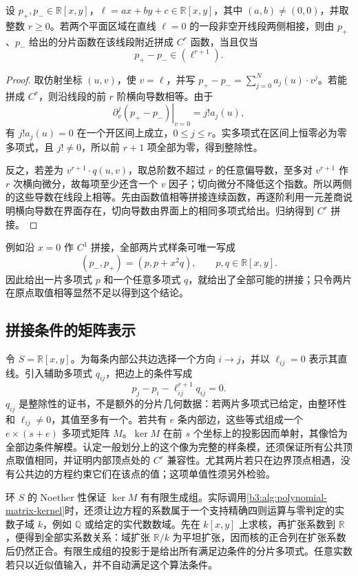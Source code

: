 \begin{proposition}\label{b3:prop:spline-divisibility}
	设 \(p_+,p_-\in\mathbb R[x,y]\)，\(\ell=ax+by+c\in\mathbb R[x,y]\)，其中 \((a,b)\ne(0,0)\)，并取整数 \(r\ge0\)。若两个平面区域在直线 \(\ell=0\) 的一段非空开线段两侧相接，则由 \(p_+\)、\(p_-\) 给出的分片函数在该线段附近拼成 \(C^r\) 函数，当且仅当
	\[
		p_+-p_-\in(\ell^{r+1}).
	\]
\end{proposition}
\begin{proof}
	取仿射坐标 \((u,v)\)，使 \(v=\ell\)，并写 \(p_+-p_-=\sum_{j=0}^N a_j(u)\cdot v^j\)。若能拼成 \(C^r\)，则沿线段的前 \(r\) 阶横向导数相等。由于
	\[
		\left.\partial_v^j(p_+-p_-)\right|_{v=0}=j!a_j(u),
	\]
	有 \(j!a_j(u)=0\) 在一个开区间上成立，\(0\le j\le r\)。实多项式在区间上恒零必为零多项式，且 \(j!\ne0\)，所以前 \(r+1\) 项全部为零，得到整除性。

	反之，若差为 \(v^{r+1}\cdot q(u,v)\)，取总阶数不超过 \(r\) 的任意偏导数，至多对 \(v^{r+1}\) 作 \(r\) 次横向微分，故每项至少还含一个 \(v\) 因子；切向微分不降低这个指数。所以两侧的这些导数在线段上相等。先由函数值相等拼接连续函数，再逐阶利用一元差商说明横向导数在界面存在，切向导数由界面上的相同多项式给出。归纳得到 \(C^r\) 拼接。
\end{proof}

例如沿 \(x=0\) 作 \(C^1\) 拼接，全部两片式样条可唯一写成
\[
	(p_-,p_+)=(p,p+x^2q),\qquad p,q\in\mathbb R[x,y].
\]
因此给出一片多项式 \(p\) 和一个任意多项式 \(q\)，就给出了全部可能的拼接；只令两片在原点取值相等显然不足以得到这个结论。

\subsection{拼接条件的矩阵表示}
\label{b3:subsec:2106:02}

令 \(S=\mathbb R[x,y]\)。为每条内部公共边选择一个方向 \(i\to j\)，并以 \(\ell_{ij}=0\) 表示其直线。引入辅助多项式 \(q_{ij}\)，把边上的条件写成
\[
	p_j-p_i-\ell_{ij}^{r+1}q_{ij}=0.
\]
\(q_{ij}\) 是整除性的证书，不是额外的分片几何数据：若两片多项式已给定，由整环性和 \(\ell_{ij}\ne0\)，其值至多有一个。若共有 \(e\) 条内部边，这些等式组成一个 \(e\times(s+e)\) 多项式矩阵 \(M\)。\(\ker M\) 在前 \(s\) 个坐标上的投影因而单射，其像恰为全部边条件解模。认定一般划分上的这个像为完整的样条模，还须保证所有公共顶点取值相同，并证明内部顶点处的 \(C^r\) 兼容性。尤其两片若只在边界顶点相遇，没有公共边的方程约束它们在该点的值；这项单值性须另外检验。

\ProseParagraphBreak
环 \(S\) 的 Noether 性保证 \(\ker M\) 有有限生成组。实际调用\cref{b3:alg:polynomial-matrix-kernel}时，还须让边方程的系数属于一个支持精确四则运算与零判定的实数子域 \(k\)，例如 \(\mathbb Q\) 或给定的实代数数域。先在 \(k[x,y]\) 上求核，再扩张系数到 \(\mathbb R\)，便得到全部实系数关系：域扩张 \(\mathbb R/k\) 为平坦扩张，因而核的正合列在扩张系数后仍然正合。有限生成组的投影于是给出所有满足边条件的分片多项式。任意实数若只以近似值输入，并不自动满足这个算法条件。

